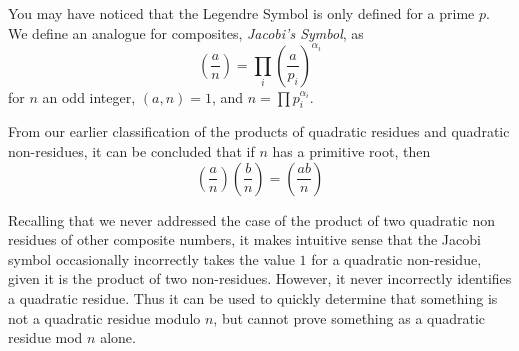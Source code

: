 \documentclass{article}
\theoremstyle{plain}
\begin{document}
\par You may have noticed that the Legendre Symbol is only defined for a prime $p$. We define an analogue for composites, \textit{Jacobi's Symbol}, as
 \[\left( \dfrac{a}{n} \right)  = \prod_i \left( \frac{a}{p_i} \right) ^{\alpha_i} \]
  for $n$ an odd integer, $(a,n) = 1$, and $n = \prod p_i^{\alpha_i}$. 
  
\par From our earlier classification of the products of quadratic residues and quadratic non-residues, it can be concluded that if $n$ has a primitive root, then 
\[ \left(\dfrac{a}{n} \right) \left( \dfrac{b}{n} \right) = \left(\dfrac{ab}{n} \right) \]

\par Recalling that we never addressed the case of the product of two quadratic non residues of other composite numbers, it makes intuitive sense that the Jacobi symbol occasionally incorrectly takes the value $1$ for a quadratic non-residue, given it is the product of two non-residues. However, it never incorrectly identifies a quadratic residue.  Thus it can be used to quickly determine that something is not a quadratic residue modulo $n$, but cannot prove something as a quadratic residue mod $n$ alone.




\end{document}
